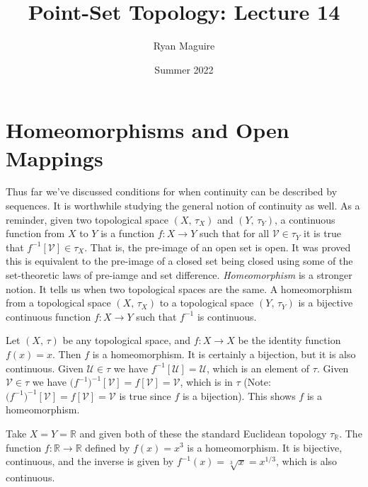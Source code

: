 \documentclass{article}
\title{Point-Set Topology: Lecture 14}
\author{Ryan Maguire}
\date{Summer 2022}
\theoremstyle{plain}
\theoremstyle{normal}
\newenvironment{example}{%
    \pushQED{\qed}\renewcommand{\qedsymbol}{$\blacksquare$}\examplex%
}{%
    \popQED\endexamplex%
}
\newenvironment{definition}{%
    \pushQED{\qed}\renewcommand{\qedsymbol}{$\blacksquare$}\definitionx%
}{%
    \popQED\enddefinitionx%
}
\begin{document}
    \maketitle
    \section{Homeomorphisms and Open Mappings}
        Thus far we've discussed conditions for when continuity can be
        described by sequences. It is worthwhile studying the general notion
        of continuity as well. As a reminder, given two topological space
        $(X,\,\tau_{X})$ and $(Y,\,\tau_{Y})$, a continuous function from $X$
        to $Y$ is a function $f:X\rightarrow{Y}$ such that for all
        $\mathcal{V}\in\tau_{Y}$ it is true that
        $f^{-1}[\mathcal{V}]\in\tau_{X}$. That is, the pre-image of an open set
        is open. It was proved this is equivalent to the pre-image of a closed
        set being closed using some of the set-theoretic laws of pre-iamge and
        set difference. \textit{Homeomorphism} is a stronger notion. It tells
        us when two topological spaces are the same.
        \begin{definition}[\textbf{Homeomorphism}]
            A homeomorphism from a topological space $(X,\,\tau_{X})$ to a
            topological space $(Y,\,\tau_{Y})$ is a bijective continuous
            function $f:X\rightarrow{Y}$ such that $f^{-1}$ is continuous.
        \end{definition}
        \begin{example}
            Let $(X,\,\tau)$ be any topological space, and
            $f:X\rightarrow{X}$ be the identity function $f(x)=x$. Then $f$ is
            a homeomorphism. It is certainly a bijection, but it is also
            continuous. Given $\mathcal{U}\in\tau$ we have
            $f^{-1}[\mathcal{U}]=\mathcal{U}$, which is an element of $\tau$.
            Given $\mathcal{V}\in\tau$ we have
            $\big(f^{-1}\big)^{-1}[\mathcal{V}]=f[\mathcal{V}]=\mathcal{V}$,
            which is in $\tau$ (Note:
            $\big(f^{-1}\big)^{-1}[\mathcal{V}]=f[\mathcal{V}]=\mathcal{V}$
            is true since $f$ is a bijection). This shows $f$ is a
            homeomorphism.
        \end{example}
        \begin{example}
            Take $X=Y=\mathbb{R}$ and given both of these the standard Euclidean
            topology $\tau_{\mathbb{R}}$. The function
            $f:\mathbb{R}\rightarrow\mathbb{R}$ defined by $f(x)=x^{3}$ is
            a homeomorphism. It is bijective, continuous, and the inverse is
            given by $f^{-1}(x)=\sqrt[3]{x}=x^{1/3}$, which is also continuous.
        \end{example}
\end{document}
